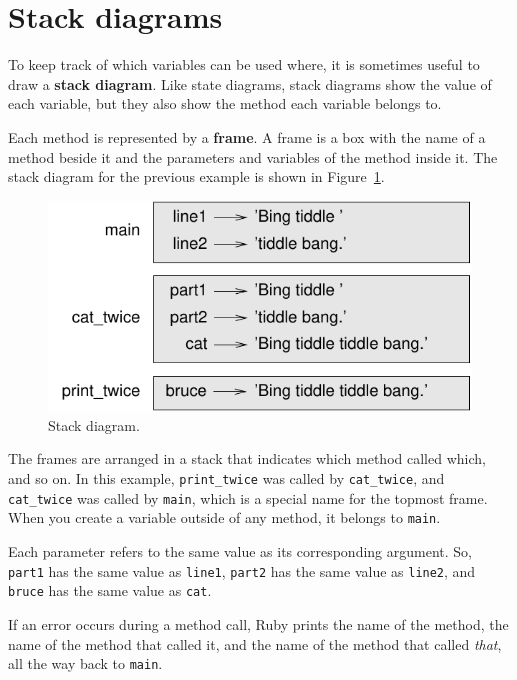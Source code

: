 \documentclass[10pt]{book}
\begin{document}
\section{Stack diagrams}
\label{stackdiagram}

To keep track of which variables can be used where, it is sometimes
useful to draw a {\bf stack diagram}.  Like state diagrams, stack
diagrams show the value of each variable, but they also show the
method each variable belongs to.

Each method is represented by a {\bf frame}.  A frame is a box with
the name of a method beside it and the parameters and variables of
the method inside it.  The stack diagram for the previous example is
shown in Figure~\ref{fig.stack}.

\begin{figure}
\centerline
{\includegraphics[scale=0.8]{figs/stack.pdf}}
\caption{Stack diagram.}
\label{fig.stack}
\end{figure}


The frames are arranged in a stack that indicates which method
called which, and so on.  In this example, \verb"print_twice"
was called by \verb"cat_twice", and \verb"cat_twice" was called by 
\verb"main", which is a special name for the topmost frame.  When
you create a variable outside of any method, it belongs to 
\verb"main".


Each parameter refers to the same value as its corresponding
argument.  So, {\tt part1} has the same value as
{\tt line1}, {\tt part2} has the same value as {\tt line2},
and {\tt bruce} has the same value as {\tt cat}.

If an error occurs during a method call, Ruby prints the
name of the method, the name of the method that called
it, and the name of the method that called {\em that}, all the
way back to \verb"main".
\end{document}
